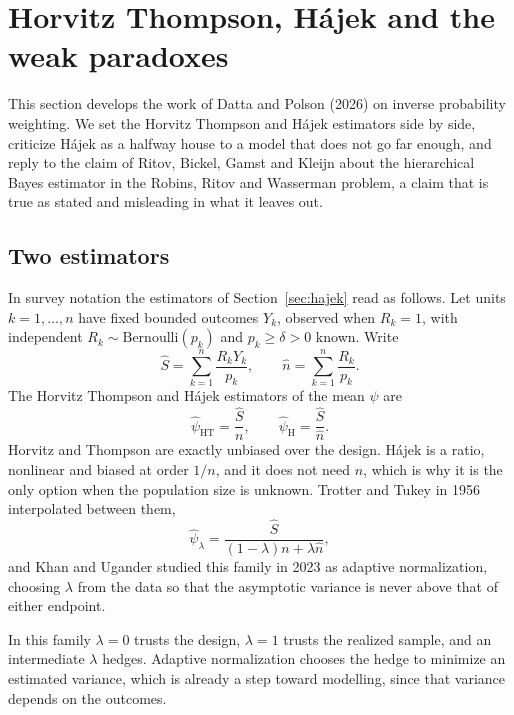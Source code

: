\section{Horvitz Thompson, H\'ajek and the weak paradoxes}\label{sec:weak}

This section develops the work of Datta and Polson (2026) on inverse probability weighting. We set the Horvitz Thompson and H\'ajek estimators side by side, criticize H\'ajek as a halfway house to a model that does not go far enough, and reply to the claim of Ritov, Bickel, Gamst and Kleijn about the hierarchical Bayes estimator in the Robins, Ritov and Wasserman problem, a claim that is true as stated and misleading in what it leaves out.

\subsection{Two estimators}

In survey notation the estimators of Section~\ref{sec:hajek} read as follows. Let units $k = 1, \ldots, n$ have fixed bounded outcomes $Y_k$, observed when $R_k = 1$, with independent $R_k \sim \mathrm{Bernoulli}(p_k)$ and $p_k \geq \delta > 0$ known. Write
\[
\hat S = \sum_{k=1}^n \frac{R_k Y_k}{p_k}, \qquad \hat n = \sum_{k=1}^n \frac{R_k}{p_k}.
\]
The Horvitz Thompson and H\'ajek estimators of the mean $\psi$ are
\[
\hat\psi_{\mathrm{HT}} = \frac{\hat S}{n}, \qquad \hat\psi_{\mathrm{H}} = \frac{\hat S}{\hat n}.
\]
Horvitz and Thompson are exactly unbiased over the design. H\'ajek is a ratio, nonlinear and biased at order $1/n$, and it does not need $n$, which is why it is the only option when the population size is unknown. Trotter and Tukey in 1956 interpolated between them,
\[
\hat\psi_{\lambda} = \frac{\hat S}{(1 - \lambda)n + \lambda\hat n},
\]
and Khan and Ugander studied this family in 2023 as adaptive normalization, choosing $\lambda$ from the data so that the asymptotic variance is never above that of either endpoint.

In this family $\lambda = 0$ trusts the design, $\lambda = 1$ trusts the realized sample, and an intermediate $\lambda$ hedges. Adaptive normalization chooses the hedge to minimize an estimated variance, which is already a step toward modelling, since that variance depends on the outcomes.

